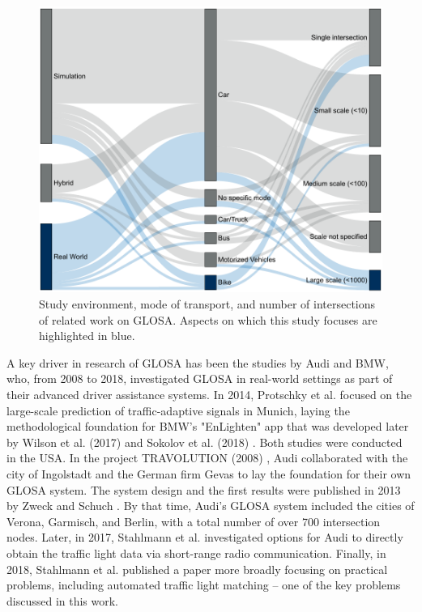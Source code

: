 \begin{figure}
\centering
\includegraphics[width=\linewidth]{images/related-work-sankey.pdf}
\caption{Study environment, mode of transport, and number of intersections of related work on GLOSA. Aspects on which this study focuses are highlighted in blue.}
\label{fig:related-work-piechart}
\end{figure}

A key driver in research of GLOSA has been the studies by Audi and BMW, who, from 2008 to 2018, investigated GLOSA in real-world settings as part of their advanced driver assistance systems. In 2014, Protschky et al. \cite{protschky_extensive_2014, protschky_adaptive_2014} focused on the large-scale prediction of traffic-adaptive signals in Munich, laying the methodological foundation for BMW's "EnLighten" app that was developed later by Wilson et al. (2017) \cite{wilson_driver_2017} and Sokolov et al. (2018) \cite{sokolov_effects_2018}. Both studies were conducted in the USA. In the project TRAVOLUTION (2008) \cite{braun_travolution-netzweite_2009}, Audi collaborated with the city of Ingolstadt and the German firm Gevas to lay the foundation for their own GLOSA system. The system design and the first results were published in 2013 by Zweck and Schuch \cite{zweck_traffic_2013}. By that time, Audi's GLOSA system included the cities of Verona, Garmisch, and Berlin, with a total number of over 700 intersection nodes. Later, in 2017, Stahlmann et al. \cite{stahlmann_multi-hop_2017} investigated options for Audi to directly obtain the traffic light data via short-range radio communication. Finally, in 2018, Stahlmann et al. \cite{stahlmann_exploring_2018} published a paper more broadly focusing on practical problems, including automated traffic light matching -- one of the key problems discussed in this work.

